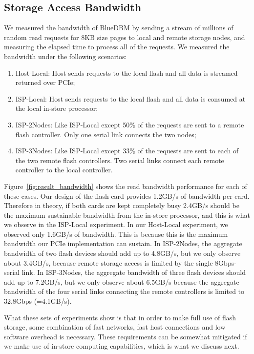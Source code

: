 \subsection{Storage Access Bandwidth}

We measured the bandwidth of BlueDBM by sending a stream of millions of random read requests for 8KB size pages to local and remote storage nodes, and measuring the elapsed time to process all of the requests.
We measured the bandwidth under the following scenarios:
\begin{enumerate}
\item Host-Local: Host sends requests to the local flash and all data is streamed returned over PCIe;
\item ISP-Local: Host sends requests to the local flash and all data is consumed at the local in-store processor;
\item ISP-2Nodes: Like ISP-Local except 50\% of the requests are sent to a remote flash controller. Only one serial link connects the two nodes;
\item ISP-3Nodes: Like ISP-Local except 33\% of the requests are sent to each of the two remote flash controllers. Two serial links connect each remote controller to the local controller.
\end{enumerate}

Figure~\ref{fig:result_bandwidth} shows the read bandwidth performance for each of these cases. Our design of the flash card provides 1.2GB/s of bandwidth per card. Therefore in theory, if both cards are kept completely busy 2.4GB/s should be the maximum sustainable bandwidth from the in-store processor, and this is what we observe in the ISP-Local experiment. In our Host-Local experiment, we observed only 1.6GB/s of bandwidth. This is because this is the maximum bandwidth our PCIe implementation can sustain. In ISP-2Nodes, the aggregate bandwidth of two flash devices should add up to 4.8GB/s, but we only observe about 3.4GB/s, because remote storage access is limited by the single 8Gbps-serial link. In ISP-3Nodes, the aggregate bandwidth of three flash devices should add up to 7.2GB/s, but we only observe about 6.5GB/s because the aggregate bandwidth of the four serial links connecting the remote controllers is limited to 32.8Gbps (=4.1GB/s).

What these sets of experiments show is that in order to make full use of flash storage, some combination of fast networks, fast host connections and low software overhead is necessary. These requirements can be somewhat mitigated if we make use of in-store computing capabilities, which is what we discuss next.



